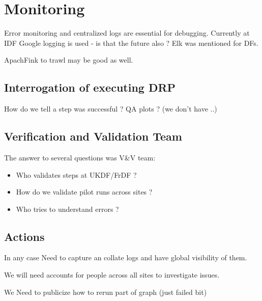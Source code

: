 \section{Monitoring}

Error monitoring and centralized logs are essential for debugging.
Currently at IDF Google logging is used -  is that the future also ?
Elk was mentioned for DFs.

ApachFink to trawl may be good as well.

\subsection{Interrogation of executing DRP }
How do we tell a step was successful ? QA plots ? (we don't have ..)

\subsection {Verification and Validation Team}
The answer to several questions was V\&V team:
\begin{itemize}
\item Who validates steps at UKDF/FrDF ?
\item How do we validate pilot runs across sites ?
\item Who tries to understand errors ?
\end{itemize}


\subsection {Actions}
In any case Need to capture an collate logs and have  global visibility of them.

We will need accounts for people across all sites to investigate issues.

We Need to publicize how to rerun part of graph (just failed bit)
